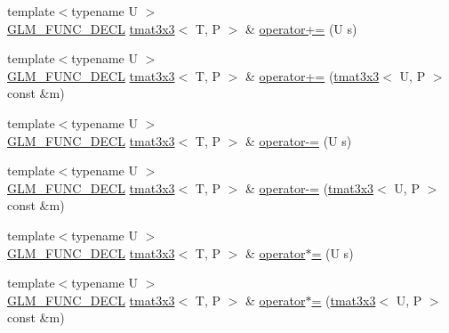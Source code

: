 \begin{DoxyCompactItemize}
\item 
{\footnotesize template$<$typename U $>$ }\\\hyperlink{setup_8hpp_ab2d052de21a70539923e9bcbf6e83a51}{G\+L\+M\+\_\+\+F\+U\+N\+C\+\_\+\+D\+E\+CL} \hyperlink{structglm_1_1detail_1_1tmat3x3}{tmat3x3}$<$ T, P $>$ \& \hyperlink{structglm_1_1detail_1_1tmat3x3_a691337477f60d50bcdef7ae0372b1f06}{operator+=} (U s)
\item 
{\footnotesize template$<$typename U $>$ }\\\hyperlink{setup_8hpp_ab2d052de21a70539923e9bcbf6e83a51}{G\+L\+M\+\_\+\+F\+U\+N\+C\+\_\+\+D\+E\+CL} \hyperlink{structglm_1_1detail_1_1tmat3x3}{tmat3x3}$<$ T, P $>$ \& \hyperlink{structglm_1_1detail_1_1tmat3x3_a2e5ebe3eeb51b9e64924b818b7a7cd0d}{operator+=} (\hyperlink{structglm_1_1detail_1_1tmat3x3}{tmat3x3}$<$ U, P $>$ const \&m)
\item 
{\footnotesize template$<$typename U $>$ }\\\hyperlink{setup_8hpp_ab2d052de21a70539923e9bcbf6e83a51}{G\+L\+M\+\_\+\+F\+U\+N\+C\+\_\+\+D\+E\+CL} \hyperlink{structglm_1_1detail_1_1tmat3x3}{tmat3x3}$<$ T, P $>$ \& \hyperlink{structglm_1_1detail_1_1tmat3x3_a4ee83a0dd2a65d7e90b9b21479eee52a}{operator-\/=} (U s)
\item 
{\footnotesize template$<$typename U $>$ }\\\hyperlink{setup_8hpp_ab2d052de21a70539923e9bcbf6e83a51}{G\+L\+M\+\_\+\+F\+U\+N\+C\+\_\+\+D\+E\+CL} \hyperlink{structglm_1_1detail_1_1tmat3x3}{tmat3x3}$<$ T, P $>$ \& \hyperlink{structglm_1_1detail_1_1tmat3x3_acbadd4964bdf31cdd701bd509b8bad03}{operator-\/=} (\hyperlink{structglm_1_1detail_1_1tmat3x3}{tmat3x3}$<$ U, P $>$ const \&m)
\item 
{\footnotesize template$<$typename U $>$ }\\\hyperlink{setup_8hpp_ab2d052de21a70539923e9bcbf6e83a51}{G\+L\+M\+\_\+\+F\+U\+N\+C\+\_\+\+D\+E\+CL} \hyperlink{structglm_1_1detail_1_1tmat3x3}{tmat3x3}$<$ T, P $>$ \& \hyperlink{structglm_1_1detail_1_1tmat3x3_ad720ed5f090b44ffc9de39e217e14778}{operator$\ast$=} (U s)
\item 
{\footnotesize template$<$typename U $>$ }\\\hyperlink{setup_8hpp_ab2d052de21a70539923e9bcbf6e83a51}{G\+L\+M\+\_\+\+F\+U\+N\+C\+\_\+\+D\+E\+CL} \hyperlink{structglm_1_1detail_1_1tmat3x3}{tmat3x3}$<$ T, P $>$ \& \hyperlink{structglm_1_1detail_1_1tmat3x3_a688e29783f988517fec9fb416af1b54e}{operator$\ast$=} (\hyperlink{structglm_1_1detail_1_1tmat3x3}{tmat3x3}$<$ U, P $>$ const \&m)
\item 

\end{DoxyCompactItemize}
